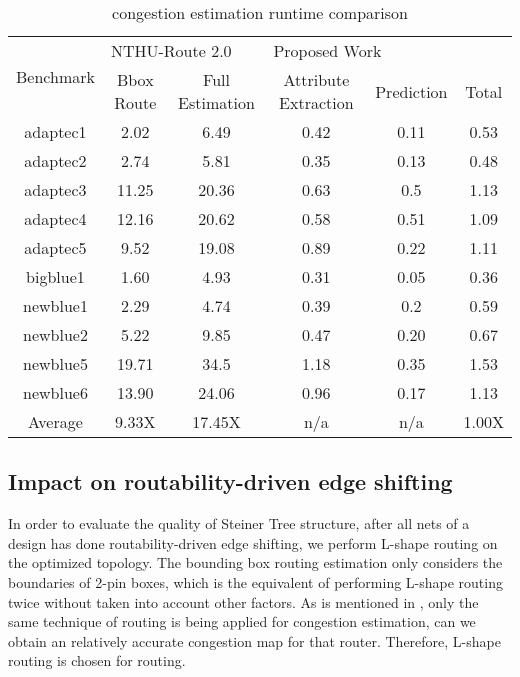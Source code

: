 \begin{table*}[htbp]
\caption{congestion estimation runtime comparison}
\begin{center}
\begin{tabular}{|c|c|c|c|c|c|}
\hline
\multirow{2}{*}{Benchmark} & \multicolumn{2}{l|}{NTHU-Route 2.0 \cite{NTHU}} & \multicolumn{3}{l|}{Proposed Work}        \\ \cline{2-6} 
                           & Bbox Route   & Full Estimation  & Attribute Extraction & Prediction & Total \\ \hline
adaptec1                   & 2.02         & 6.49             & 0.42                 & 0.11       & 0.53  \\ \hline
adaptec2                   & 2.74         & 5.81             & 0.35                 & 0.13       & 0.48  \\ \hline
adaptec3                   & 11.25        & 20.36            & 0.63                 & 0.5        & 1.13  \\ \hline
adaptec4                   & 12.16        & 20.62            & 0.58                 & 0.51       & 1.09  \\ \hline
adaptec5                   & 9.52         & 19.08            & 0.89                 & 0.22       & 1.11  \\ \hline
bigblue1                   & 1.60         & 4.93             & 0.31                 & 0.05       & 0.36  \\ \hline
newblue1                   & 2.29         & 4.74             & 0.39                 & 0.2        & 0.59  \\ \hline
newblue2                   & 5.22         & 9.85             & 0.47                 & 0.20       & 0.67  \\ \hline
newblue5                   & 19.71        & 34.5             & 1.18                 & 0.35       & 1.53  \\ \hline
newblue6                   & 13.90        & 24.06            & 0.96                 & 0.17       & 1.13  \\ \hline
Average                    & 9.33X        & 17.45X           & n/a                  & n/a        & 1.00X \\ \hline
\end{tabular}
\label{tab:runtime}
\end{center}
\end{table*}

\subsection{Impact on routability-driven edge shifting}
In order to evaluate the quality of Steiner Tree structure, after all nets of a design has done routability-driven edge shifting, we perform L-shape routing on the optimized topology. The bounding box routing estimation only considers the boundaries of 2-pin boxes, which is the equivalent of performing L-shape routing twice without taken into account other factors. As is mentioned in \cite{fastroute}, only the same technique of routing is being applied for congestion estimation, can we obtain an relatively accurate congestion map for that router. Therefore, L-shape routing is chosen for routing.

